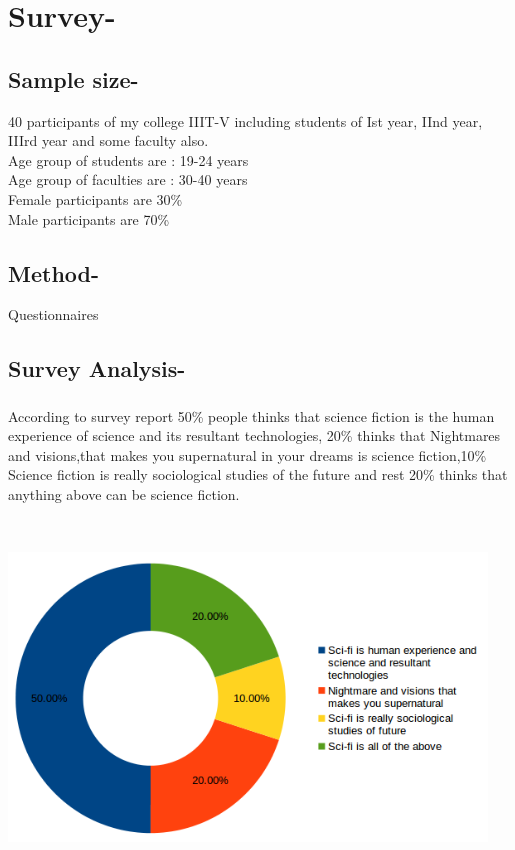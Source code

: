 \documentclass[12pt]{report}
\begin{document}
\section{Survey-}
\subsection{Sample size-}
\LARGE
40 participants of my college IIIT-V including students of  Ist year, IInd year, IIIrd year and some faculty also.\\

Age group of students are : 19-24 years\\

Age group of faculties are : 30-40 years \\ 

Female participants are 30\% \\

Male participants are 70\%
\\

\subsection{Method-}
\LARGE
Questionnaires
\newpage

\subsection{Survey Analysis-}
\LARGE
\subsubsection{}  According to survey report
50\% people thinks that science fiction is the human experience of science and its resultant technologies, 20\% thinks that Nightmares and visions,that makes you supernatural in your dreams is science fiction,10\% Science fiction is really sociological  studies of the future and rest 20\% thinks that anything above can be science fiction.\\
\includegraphics[width=5in,height=4in]{1.png}
\newpage
\LARGE
\end{document}
